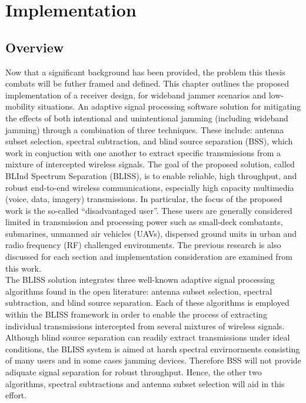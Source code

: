 \chapter{Implementation}
\label{ch:implementation}

\section{Overview}

Now that a significant background has been provided, the problem this thesis combats will be futher framed and defined.  This chapter outlines the proposed implementation of a receiver design, for wideband jammer scenarios and low-mobility situations.  An adaptive signal processing software solution for mitigating the effects of both intentional and unintentional jamming (including wideband jamming) through a combination of three techniques.  These include: antenna subset selection, spectral subtraction, and blind source separation (BSS), which work in conjuction with one another to extract specific transmissions from a mixture of intercepted wireless signals. The goal of the proposed solution, called BLInd Spectrum Separation (BLISS), is to enable reliable, high throughput, and robust end-to-end wireless communications, especially high capacity multimedia (voice, data, imagery) transmissions. In particular, the focus of the proposed work is the so-called ``disadvantaged user''.  These users are generally considered limited in transmission and processing power such as small-deck combatants, submarines, unmanned air vehicles (UAVs), dispersed ground units in urban and radio frequency (RF) challenged environments.  The previous research is also discussed for each section and implementation consideration are examined from this work.\\

The BLISS solution integrates three well-known adaptive signal processing algorithms found in the open literature: antenna subset selection, spectral subtraction, and blind source separation. Each of these algorithms is employed within the BLISS framework in order to enable the process of extracting individual transmissions intercepted from several mixtures of wireless signals. Although blind source separation can readily extract transmissions under ideal conditions, the BLISS system is aimed at harsh spectral envirnorments consisting of many users and in some cases jamming devices. Therefore BSS will not provide adiquate signal separation for robust throughput.  Hence, the other two algorithms, spectral subtractions and antenna subset selection will aid in this effort.\\

